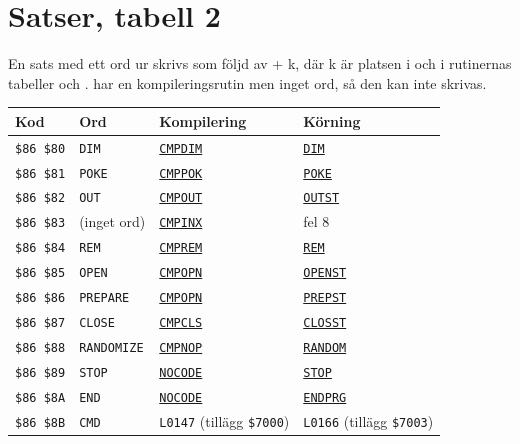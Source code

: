 \section{Satser, tabell 2}
\noindent En sats med ett ord ur  skrivs som  följd
av  + k, där k är platsen i  och i rutinernas
tabeller  och .   har en
kompileringsrutin men inget ord, så den kan inte skrivas.\par\medskip
\TabNeed{30mm}
\begin{small}\setlength{\LTleft}{0pt}\setlength{\LTright}{\fill}\begin{longtable}{@{}l l l l@{}}
\textbf{Kod} & \textbf{Ord} & \textbf{Kompilering} & \textbf{Körning}\\\hline\endhead
\texttt{\$86 \$80} & \texttt{DIM} & \hyperlink{l:CMPDIM}{\texttt{CMPDIM}} & \hyperlink{l:DIM}{\texttt{DIM}}\\
\texttt{\$86 \$81} & \texttt{POKE} & \hyperlink{l:CMPPOK}{\texttt{CMPPOK}} & \hyperlink{l:POKE}{\texttt{POKE}}\\
\texttt{\$86 \$82} & \texttt{OUT} & \hyperlink{l:CMPOUT}{\texttt{CMPOUT}} & \hyperlink{l:OUTST}{\texttt{OUTST}}\\
\texttt{\$86 \$83} & (inget ord) & \hyperlink{l:CMPINX}{\texttt{CMPINX}} & fel 8\\
\texttt{\$86 \$84} & \texttt{REM} & \hyperlink{l:CMPREM}{\texttt{CMPREM}} & \hyperlink{l:REM}{\texttt{REM}}\\
\texttt{\$86 \$85} & \texttt{OPEN} & \hyperlink{l:CMPOPN}{\texttt{CMPOPN}} & \hyperlink{l:OPENST}{\texttt{OPENST}}\\
\texttt{\$86 \$86} & \texttt{PREPARE} & \hyperlink{l:CMPOPN}{\texttt{CMPOPN}} & \hyperlink{l:PREPST}{\texttt{PREPST}}\\
\texttt{\$86 \$87} & \texttt{CLOSE} & \hyperlink{l:CMPCLS}{\texttt{CMPCLS}} & \hyperlink{l:CLOSST}{\texttt{CLOSST}}\\
\texttt{\$86 \$88} & \texttt{RANDOMIZE} & \hyperlink{l:CMPNOP}{\texttt{CMPNOP}} & \hyperlink{l:RANDOM}{\texttt{RANDOM}}\\
\texttt{\$86 \$89} & \texttt{STOP} & \hyperlink{l:NOCODE}{\texttt{NOCODE}} & \hyperlink{l:STOP}{\texttt{STOP}}\\
\texttt{\$86 \$8A} & \texttt{END} & \hyperlink{l:NOCODE}{\texttt{NOCODE}} & \hyperlink{l:ENDPRG}{\texttt{ENDPRG}}\\
\texttt{\$86 \$8B} & \texttt{CMD} & \texttt{L0147} {\footnotesize(tillägg \texttt{\$7000})} & \texttt{L0166} {\footnotesize(tillägg \texttt{\$7003})}\\

\end{longtable}
\end{small}
